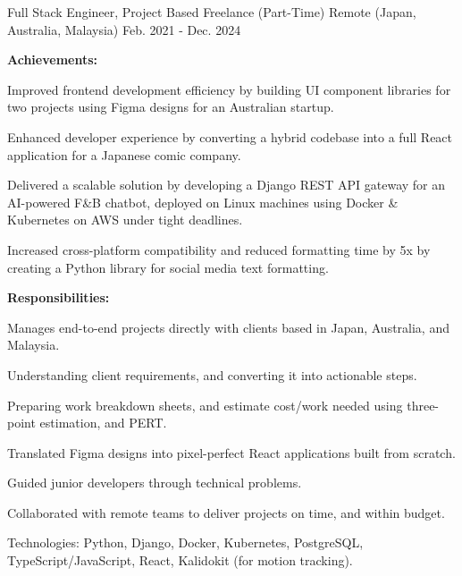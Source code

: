 \begin{cventries}
  \cventry
    {Full Stack Engineer, Project Based} %
    {Freelance (Part-Time)} %
    {Remote (Japan, Australia, Malaysia)} %
    {Feb. 2021 - Dec. 2024} %
    {
      \textbf{Achievements:}
      \vspace{1.5em}
      \begin{cvitems} %
        \item {Improved frontend development efficiency by building UI component libraries for two projects using Figma designs for an Australian startup.}
        \item {Enhanced developer experience by converting a hybrid codebase into a full React application for a Japanese comic company.}
        \item {Delivered a scalable solution by developing a Django REST API gateway for an AI-powered F\&B chatbot, deployed on Linux machines using Docker \& Kubernetes on AWS under tight deadlines.}
        \item {Increased cross-platform compatibility and reduced formatting time by 5x by creating a Python library for social media text formatting.}
      \end{cvitems}
      \textbf{Responsibilities:}
      \vspace{1.5em}
      \begin{cvitems} %
        \item {Manages end-to-end projects directly with clients based in Japan, Australia, and Malaysia.}
        \item {Understanding client requirements, and converting it into actionable steps.}
        \item {Preparing work breakdown sheets, and estimate cost/work needed using three-point estimation, and PERT.}
        \item {Translated Figma designs into pixel-perfect React applications built from scratch.}
        \item {Guided junior developers through technical problems.}
        \item {Collaborated with remote teams to deliver projects on time, and within budget.}
        \item {Technologies: Python, Django, Docker, Kubernetes, PostgreSQL, TypeScript/JavaScript, React, Kalidokit (for motion tracking).}
      \end{cvitems}
    }


\end{cventries}
